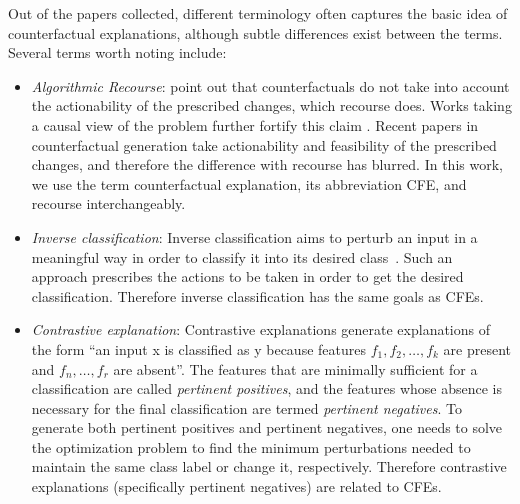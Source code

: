 Out of the papers collected, different terminology often captures the basic idea of counterfactual explanations, although subtle differences exist between the terms. Several terms worth noting include:
\begin{itemize}[leftmargin=*]
    \item \emph{Algorithmic Recourse}: \citet{Ustun19:Actionable} point out that counterfactuals do not take into account the actionability of the prescribed changes, which recourse does. Works taking a causal view of the problem further fortify this claim \citep{karimi_algorithmic_2020,karimi-imperfect:2020}. 
    Recent papers in counterfactual generation take actionability and feasibility of the prescribed changes, and therefore the difference with recourse has blurred. In this work, we use the term counterfactual explanation, its abbreviation CFE, and recourse interchangeably. 
    
    \item \emph{Inverse classification}: Inverse classification aims to perturb an input in a meaningful way in order to classify it into its desired class~\citep{inverse-classification1,inverse-classification2}. Such an approach prescribes the actions to be taken in order to get the desired classification. Therefore inverse classification has the same goals as CFEs. 
    
    \item \emph{Contrastive explanation}: Contrastive explanations generate explanations of the form ``an input x is classified as y because features $f_1, f_2,\dots, f_k$ are present and $f_n,\dots,f_r$ are absent''. 
    The features that are minimally sufficient for a classification are called {\em pertinent positives}, and the features whose absence is necessary for the final classification are termed {\em pertinent negatives}. 
    To generate both pertinent positives and pertinent negatives, one needs to solve the optimization problem to find the minimum perturbations needed to maintain the same class label or change it, respectively. Therefore contrastive explanations (specifically pertinent negatives) are related to CFEs. 
    

\end{itemize}
